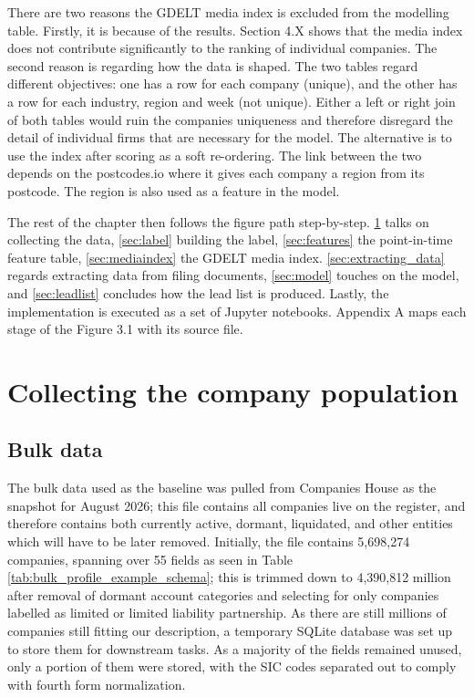 \documentclass[ %
                    author={Natchalin Iwsakul \\[0.4em] Inkaphol Siriwongwattana \\[0.4em] Tanaphan Kummaraphat \\[0.6em] Patorn Srisupap},,
                supervisor={Fernando Moreno-Pino},
                    degree={MSc},
                     title={Propensity Modelling for SME Commercial Lending Using Open Public Data
},
                  subtitle={Companies House and GDELT as predictors of first-time borrowing},
                      type={},
                      year={2026}]{dissertation}
\begin{document}
There are two reasons the GDELT media index is excluded from the modelling table. Firstly, it is because of the results. Section 4.X shows that the media index does not contribute significantly to the ranking of individual companies. The second reason is regarding how the data is shaped. The two tables regard different objectives: one has a row for each company (unique), and the other has a row for each industry, region and week (not unique). Either a left or right join of both tables would ruin the companies uniqueness and therefore disregard the detail of individual firms that are necessary for the model. The alternative is to use the index after scoring as a soft re-ordering. The link between the two depends on the postcodes.io where it gives each company a region from its postcode. The region is also used as a feature in the model.

The rest of the chapter then follows the figure path step-by-step. \ref{sec:collection} talks on collecting the data, \ref{sec:label} building the label, \ref{sec:features} the point-in-time feature table, \ref{sec:mediaindex} the GDELT media index. \ref{sec:extracting_data} regards extracting data from filing documents, \ref{sec:model} touches on the model, and \ref{sec:leadlist} concludes how the lead list is produced. Lastly, the implementation is executed as a set of Jupyter notebooks. Appendix A maps each stage of the Figure 3.1 with its source file.


\section{Collecting the company population}    
\label{sec:collection}
  \subsection{Bulk data}
  \label{chap:CH_bulk_data}
    The bulk data used as the baseline was pulled from Companies House \cite{CH_bulk_profiles} as the snapshot for August 2026; this file contains all companies live on the register, and therefore contains both currently active,  dormant, liquidated, and other entities which will have to be later removed. Initially, the file contains 5,698,274 companies, spanning over 55 fields as seen in Table \ref{tab:bulk_profile_example_schema}; this is trimmed down to 4,390,812 million after removal of dormant account categories and selecting for only companies labelled as limited or limited liability partnership. As there are still millions of companies still fitting our description, a temporary SQLite database was set up to store them for downstream tasks. As a majority of the fields remained unused, only a portion of them were stored, with the SIC codes separated out to comply with fourth form normalization.
    
\end{document}
